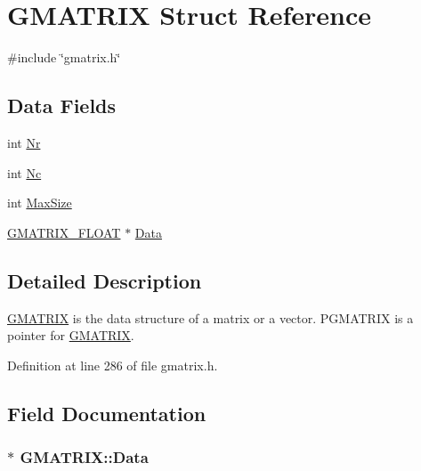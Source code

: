 \hypertarget{structGMATRIX}{\section{G\-M\-A\-T\-R\-I\-X Struct Reference}
\label{structGMATRIX}
}


{\ttfamily \#include \char`\"{}gmatrix.\-h\char`\"{}}

\subsection*{Data Fields}
\begin{DoxyCompactItemize}
\item 
int \hyperlink{structGMATRIX_ad0cd3f750b92dcd404d04ddc2ec5b5d6}{Nr}
\item 
int \hyperlink{structGMATRIX_ad90d07add5c0ed480c17f9d407a00f30}{Nc}
\item 
int \hyperlink{structGMATRIX_a1533cd0d810051967bf2e9e301e870b0}{Max\-Size}
\item 
\hyperlink{gmatrix_8h_a3b6eb94c53f70703edc155e174321477}{G\-M\-A\-T\-R\-I\-X\-\_\-\-F\-L\-O\-A\-T} $\ast$ \hyperlink{structGMATRIX_a62d318aa861b4e19c3e4ee7056980fb1}{Data}
\end{DoxyCompactItemize}


\subsection{Detailed Description}
\hyperlink{structGMATRIX}{G\-M\-A\-T\-R\-I\-X} is the data structure of a matrix or a vector. P\-G\-M\-A\-T\-R\-I\-X is a pointer for \hyperlink{structGMATRIX}{G\-M\-A\-T\-R\-I\-X}. 

Definition at line 286 of file gmatrix.\-h.



\subsection{Field Documentation}
\hypertarget{structGMATRIX_a62d318aa861b4e19c3e4ee7056980fb1}{
\subsubsection[{Data}]{$\ast$ G\-M\-A\-T\-R\-I\-X\-::\-Data}}\label{structGMATRIX_a62d318aa861b4e19c3e4ee7056980fb1}


